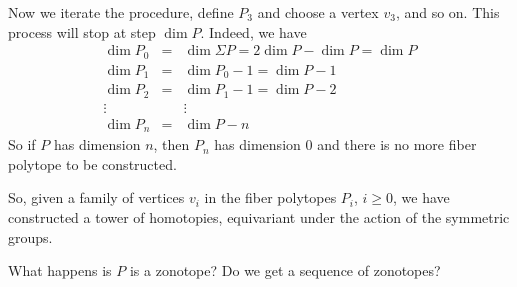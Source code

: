 Now we iterate the procedure, define $P_3$ and choose a vertex $v_3$, and so on. This process will stop at step $\dim P$. Indeed, we have 
\begin{eqnarray*}
    \dim P_0 & = & \dim \Sigma P = 2 \dim P - \dim P = \dim P \\ 
    \dim P_1 & = & \dim P_0 -1 = \dim P -1 \\
    \dim P_2 & = & \dim P_1 - 1 = \dim P -2 \\
    \vdots & & \vdots  \\
    \dim P_n & = &\dim P - n 
\end{eqnarray*}
So if $P$ has dimension $n$, then $P_n$ has dimension 0 and there is no more fiber polytope to be constructed. 

So, given a family of vertices $v_i$ in the fiber polytopes $P_i$, $i\geq 0$, we have constructed a tower of homotopies, equivariant under the action of the symmetric groups. 



\begin{example}
\end{example}

\begin{example}
\end{example}

\begin{example}
\end{example}

\begin{example} What happens is $P$ is a zonotope? Do we get a sequence of zonotopes?
\end{example}






